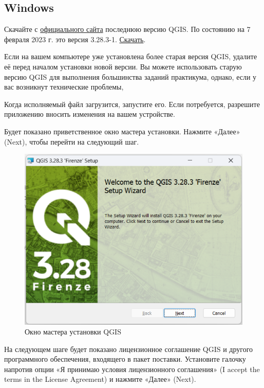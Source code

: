 \documentclass[
  12pt,
]{book}
\begin{document}
\hypertarget{windows}{%
\subsection*{Windows}\label{windows}}

Скачайте с \href{https://qgis.org/ru/site/forusers/download.html}{официального сайта} последнюю версию QGIS. По состоянию на 7 февраля 2023 г. это версия 3.28.3-1. \href{https://qgis.org/downloads/QGIS-OSGeo4W-3.28.3-1.msi}{Скачать}.

Если на вашем компьютере уже установлена более старая версия QGIS, удалите её перед началом установки новой версии. Вы можете использовать старую версию QGIS для выполнения большинства заданий практикума, однако, если у вас возникнут технические проблемы,

Когда исполняемый файл загрузится, запустите его. Если потребуется, разрешите приложению вносить изменения на вашем устройстве.

Будет показано приветственное окно мастера установки. Нажмите «Далее» (Next), чтобы перейти на следующий шаг.

\begin{figure}
\centering
\includegraphics{images/installation_instruction_win/win01.png}
\caption{Окно мастера установки QGIS}
\end{figure}

На следующем шаге будет показано лицензионное соглашение QGIS и другого программного обеспечения, входящего в пакет поставки. Установите галочку напротив опции «Я принимаю условия лицензионного соглашения» (I accept the terms in the License Agreement) и нажмите «Далее» (Next).
\end{document}
